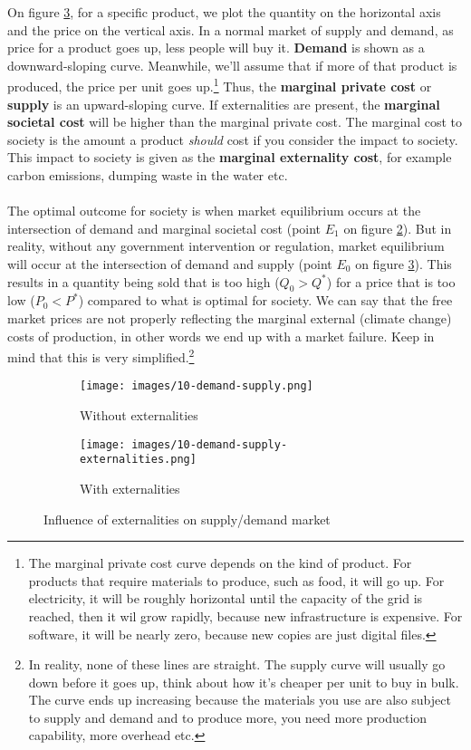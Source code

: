 \documentclass[../summary.tex]{subfiles}
\begin{document}
	On figure \ref{fig:influence-externalities}, for a specific product, we plot the quantity on the horizontal axis and the price on the vertical axis. In a normal market of supply and demand, as price for a product goes up, less people will buy it. \textbf{Demand} is shown as a downward-sloping curve. Meanwhile, we'll assume that if more of that product is produced, the price per unit goes up.\footnote{The marginal private cost curve depends on the kind of product. For products that require materials to produce, such as food, it will go up. For electricity, it will be roughly horizontal until the capacity of the grid is reached, then it wil grow rapidly, because new infrastructure is expensive. For software, it will be nearly zero, because new copies are just digital files.} Thus, the \textbf{marginal private cost} or \textbf{supply} is an upward-sloping curve. If externalities are present, the \textbf{marginal societal cost} will be higher than the marginal private cost. The marginal cost to society is the amount a product \textit{should} cost if you consider the impact to society. This impact to society is given as the \textbf{marginal externality cost}, for example carbon emissions, dumping waste in the water etc.
	\\\\ 
	The optimal outcome for society is when market equilibrium occurs at the intersection of demand and marginal societal cost (point $E_{1}$ on figure \ref{fig:demand-supply-externality}).
	But in reality, without any government intervention or regulation, market equilibrium will occur at the intersection of demand and supply (point $E_{0}$ on figure \ref{fig:influence-externalities}). This results in a quantity being sold that is too high ($Q_{0} > Q^{*}$) for a price that is too low ($P_{0} < P^{*}$) compared to what is optimal for society. We can say that the free market prices are not properly reflecting the marginal external (climate change) costs of production, in other words we end up with a market failure. Keep in mind that this is very simplified.\footnote{In reality, none of these lines are straight. The supply curve will usually go down before it goes up, think about how it's cheaper per unit to buy in bulk. The curve ends up increasing because the materials you use are also subject to supply and demand and to produce more, you need more production capability, more overhead etc.}
	
	\begin{figure}[htbp]
		\centering
		\begin{subfigure}{.5\textwidth}
			\centering
			\texttt{[image: images/10-demand-supply.png]}
			\caption{Without externalities}
			\label{fig:demand-supply}
		\end{subfigure}%
		\begin{subfigure}{.5\textwidth}
			\centering
			\texttt{[image: images/10-demand-supply-externalities.png]}
			\caption{With externalities}
			\label{fig:demand-supply-externality}
		\end{subfigure}
		\caption{Influence of externalities on supply/demand market}
		\label{fig:influence-externalities}
	\end{figure}
	 
\end{document}

